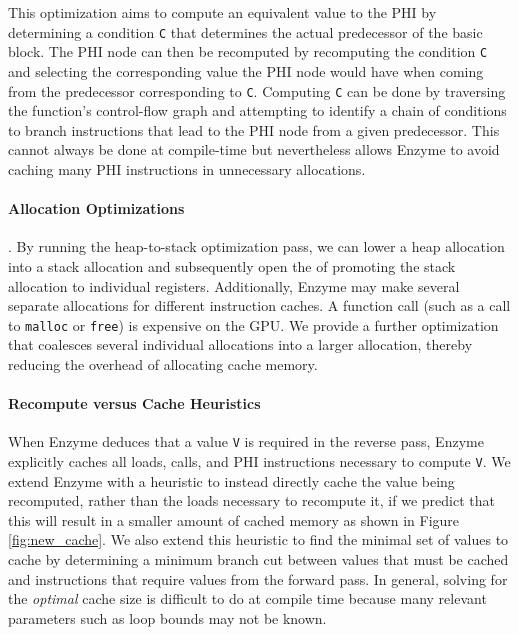 This optimization aims to compute an equivalent value to the PHI by determining a condition \texttt{C} that determines the actual predecessor of the basic block. The PHI node can then be recomputed by recomputing the condition \texttt{C} and selecting the corresponding value the PHI node would have when coming from the predecessor corresponding to \texttt{C}. Computing \texttt{C} can be done by traversing the function's control-flow graph and attempting to identify a chain of conditions to branch instructions that lead to the PHI node from a given predecessor. This cannot always be done at compile-time but nevertheless allows Enzyme to avoid caching many PHI instructions in unnecessary allocations.

\paragraph{\textbf{Allocation Optimizations}}
. By running the heap-to-stack optimization pass, we can lower a heap allocation into a stack allocation and subsequently open the  of promoting the stack allocation to individual registers. Additionally, Enzyme may make several separate allocations for different instruction caches. A function call (such as a call to \texttt{malloc} or \texttt{free}) is expensive on the GPU. We provide a further optimization that coalesces several individual allocations into a larger allocation, thereby reducing the overhead of allocating cache memory. 

\paragraph{\textbf{Recompute versus Cache Heuristics}}
When Enzyme deduces that a value \texttt{V} is required in the reverse pass, Enzyme explicitly caches all loads, calls, and PHI instructions necessary to compute \texttt{V}. We extend Enzyme with a heuristic to instead directly cache the value being recomputed, rather than the loads necessary to recompute it, if we predict that this will result in a smaller amount of cached memory as shown in Figure \ref{fig:new_cache}. We also extend this heuristic to find the minimal set of values to cache by determining a minimum branch cut between values that must be cached and instructions that require values from the forward pass. In general, solving for the \textit{optimal} cache size is difficult to do at compile time because many relevant parameters such as loop bounds may not be known.


